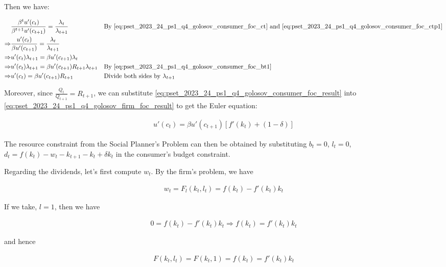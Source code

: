 Then we have:

\begin{align}
    &\frac{\beta^t u'(c_t)}{\beta^{t+1} u'(c_{t+1})} = \frac{\lambda_t}{\lambda_{t+1}} && \text{By \eqref{eq:pset_2023_24_ps1_q4_golosov_consumer_foc_ct} and \eqref{eq:pset_2023_24_ps1_q4_golosov_consumer_foc_ctp1}} \\
    \Rightarrow &\frac{u'(c_t)}{\beta u'(c_{t+1})} = \frac{\lambda_t}{\lambda_{t+1}} \\
    \Rightarrow &u'(c_t)\lambda_{t+1} = \beta u'(c_{t+1})\lambda_t \\
    \Rightarrow &u'(c_t)\lambda_{t+1} = \beta u'(c_{t+1})R_{t+1}\lambda_{t+1} && \text{By \eqref{eq:pset_2023_24_ps1_q4_golosov_consumer_foc_bt1}} \\
    \Rightarrow &u'(c_t) = \beta u'(c_{t+1})R_{t+1} && \text{Divide both sides by $\lambda_{t+1}$} \label{eq:pset_2023_24_ps1_q4_golosov_consumer_foc_result}
\end{align}

Moreover, since $\frac{Q_t}{Q_{t+1}} = R_{t+1}$, we 
can substitute \eqref{eq:pset_2023_24_ps1_q4_golosov_consumer_foc_result}
into \eqref{eq:pset_2023_24_ps1_q4_golosov_firm_foc_result} to get
the Euler equation:

\begin{align}
    u'(c_t) = \beta u'(c_{t+1})[f'(k_t) + (1 - \delta)]
\end{align}

The resource constraint from the Social Planner's Problem can 
then be obtained by substituting 
$b_t = 0$, $l_t = 0$, $d_t = f(k_t) - w_t - k_{t+1} - k_t + \delta k_t$
in the consumer's budget constraint.

Regarding the dividends, let's first 
compute $w_t$. By the firm's problem, we have

\begin{align}
    w_t = F_l(k_t, l_t) = f(k_t) - f'(k_t)k_t
\end{align}

If we take, $l = 1$, then we have 

\begin{align}
    0 = f(k_t) - f'(k_t)k_t
    \Rightarrow f(k_t) = f'(k_t)k_t
\end{align}

and hence

\begin{align}
    F(k_t, l_t) = F(k_t, 1) = f(k_t) = f'(k_t)k_t \label{eq:pset_2023_24_ps1_q4_golosov_prod_equals}
\end{align}

